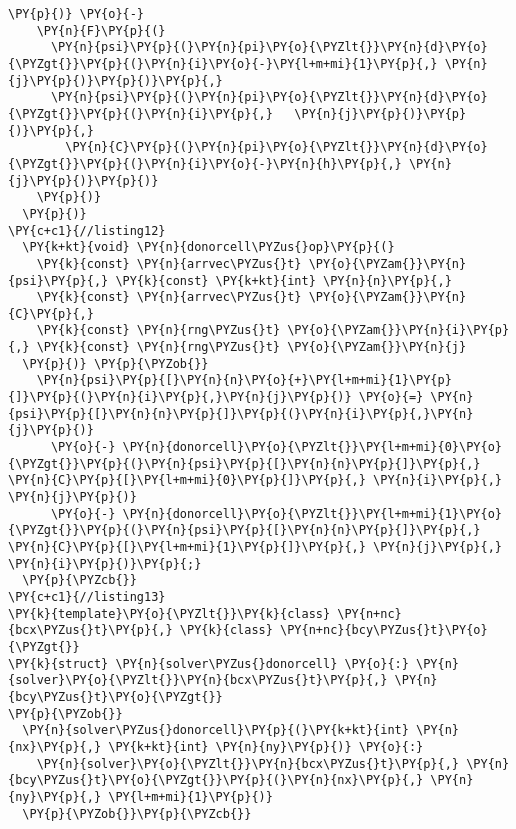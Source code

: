 \begin{Verbatim}[commandchars=\\\{\}]
    \PY{p}{)} \PY{o}{-}
    \PY{n}{F}\PY{p}{(}
      \PY{n}{psi}\PY{p}{(}\PY{n}{pi}\PY{o}{\PYZlt{}}\PY{n}{d}\PY{o}{\PYZgt{}}\PY{p}{(}\PY{n}{i}\PY{o}{-}\PY{l+m+mi}{1}\PY{p}{,} \PY{n}{j}\PY{p}{)}\PY{p}{)}\PY{p}{,} 
      \PY{n}{psi}\PY{p}{(}\PY{n}{pi}\PY{o}{\PYZlt{}}\PY{n}{d}\PY{o}{\PYZgt{}}\PY{p}{(}\PY{n}{i}\PY{p}{,}   \PY{n}{j}\PY{p}{)}\PY{p}{)}\PY{p}{,} 
        \PY{n}{C}\PY{p}{(}\PY{n}{pi}\PY{o}{\PYZlt{}}\PY{n}{d}\PY{o}{\PYZgt{}}\PY{p}{(}\PY{n}{i}\PY{o}{-}\PY{n}{h}\PY{p}{,} \PY{n}{j}\PY{p}{)}\PY{p}{)}
    \PY{p}{)}
  \PY{p}{)}
\PY{c+c1}{//listing12}
  \PY{k+kt}{void} \PY{n}{donorcell\PYZus{}op}\PY{p}{(}
    \PY{k}{const} \PY{n}{arrvec\PYZus{}t} \PY{o}{\PYZam{}}\PY{n}{psi}\PY{p}{,} \PY{k}{const} \PY{k+kt}{int} \PY{n}{n}\PY{p}{,}
    \PY{k}{const} \PY{n}{arrvec\PYZus{}t} \PY{o}{\PYZam{}}\PY{n}{C}\PY{p}{,} 
    \PY{k}{const} \PY{n}{rng\PYZus{}t} \PY{o}{\PYZam{}}\PY{n}{i}\PY{p}{,} \PY{k}{const} \PY{n}{rng\PYZus{}t} \PY{o}{\PYZam{}}\PY{n}{j}
  \PY{p}{)} \PY{p}{\PYZob{}} 
    \PY{n}{psi}\PY{p}{[}\PY{n}{n}\PY{o}{+}\PY{l+m+mi}{1}\PY{p}{]}\PY{p}{(}\PY{n}{i}\PY{p}{,}\PY{n}{j}\PY{p}{)} \PY{o}{=} \PY{n}{psi}\PY{p}{[}\PY{n}{n}\PY{p}{]}\PY{p}{(}\PY{n}{i}\PY{p}{,}\PY{n}{j}\PY{p}{)}
      \PY{o}{-} \PY{n}{donorcell}\PY{o}{\PYZlt{}}\PY{l+m+mi}{0}\PY{o}{\PYZgt{}}\PY{p}{(}\PY{n}{psi}\PY{p}{[}\PY{n}{n}\PY{p}{]}\PY{p}{,} \PY{n}{C}\PY{p}{[}\PY{l+m+mi}{0}\PY{p}{]}\PY{p}{,} \PY{n}{i}\PY{p}{,} \PY{n}{j}\PY{p}{)}
      \PY{o}{-} \PY{n}{donorcell}\PY{o}{\PYZlt{}}\PY{l+m+mi}{1}\PY{o}{\PYZgt{}}\PY{p}{(}\PY{n}{psi}\PY{p}{[}\PY{n}{n}\PY{p}{]}\PY{p}{,} \PY{n}{C}\PY{p}{[}\PY{l+m+mi}{1}\PY{p}{]}\PY{p}{,} \PY{n}{j}\PY{p}{,} \PY{n}{i}\PY{p}{)}\PY{p}{;} 
  \PY{p}{\PYZcb{}}
\PY{c+c1}{//listing13}
\PY{k}{template}\PY{o}{\PYZlt{}}\PY{k}{class} \PY{n+nc}{bcx\PYZus{}t}\PY{p}{,} \PY{k}{class} \PY{n+nc}{bcy\PYZus{}t}\PY{o}{\PYZgt{}}
\PY{k}{struct} \PY{n}{solver\PYZus{}donorcell} \PY{o}{:} \PY{n}{solver}\PY{o}{\PYZlt{}}\PY{n}{bcx\PYZus{}t}\PY{p}{,} \PY{n}{bcy\PYZus{}t}\PY{o}{\PYZgt{}} 
\PY{p}{\PYZob{}}
  \PY{n}{solver\PYZus{}donorcell}\PY{p}{(}\PY{k+kt}{int} \PY{n}{nx}\PY{p}{,} \PY{k+kt}{int} \PY{n}{ny}\PY{p}{)} \PY{o}{:}
    \PY{n}{solver}\PY{o}{\PYZlt{}}\PY{n}{bcx\PYZus{}t}\PY{p}{,} \PY{n}{bcy\PYZus{}t}\PY{o}{\PYZgt{}}\PY{p}{(}\PY{n}{nx}\PY{p}{,} \PY{n}{ny}\PY{p}{,} \PY{l+m+mi}{1}\PY{p}{)}
  \PY{p}{\PYZob{}}\PY{p}{\PYZcb{}}  


\end{Verbatim}
